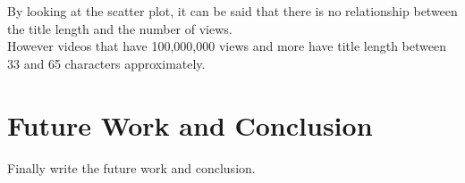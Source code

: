 \documentclass[runningheads]{llncs}
\begin{document}
By looking at the scatter plot, it can be said that there is no relationship between the title length and the number of views. \\
However videos that have 100,000,000 views and more have title length between 33 and 65 characters approximately.\\





\newpage
\section{Future Work and Conclusion}
Finally write the future work and conclusion.

\newpage



%
\centering
\end{document}
